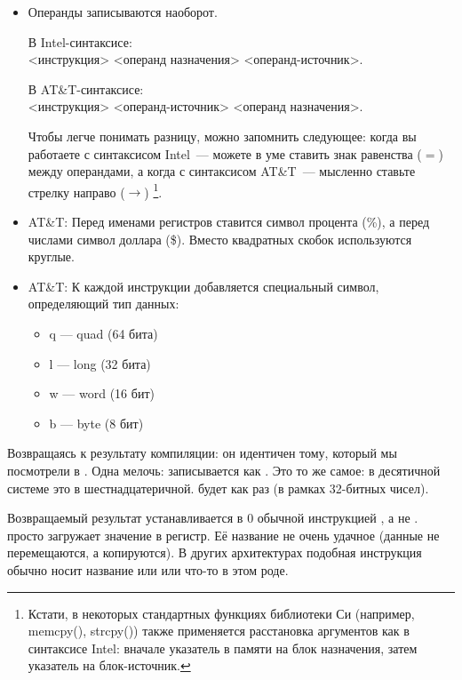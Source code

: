 \begin{itemize}

\item
Операнды записываются наоборот.

В Intel-синтаксисе: \\
<инструкция> <операнд назначения> <операнд-источник>.

В AT\&T-синтаксисе: \\
<инструкция> <операнд-источник> <операнд назначения>.

Чтобы легче понимать разницу, можно запомнить следующее:
когда вы работаете с синтаксисом Intel~--- можете в уме ставить знак равенства ($=$) между операндами,
а когда с синтаксисом AT\&T~--- мысленно ставьте стрелку направо ($\rightarrow$)
\footnote{Кстати, в некоторых стандартных функциях библиотеки Си (например, memcpy(), strcpy()) также применяется 
расстановка аргументов как в синтаксисе Intel: вначале указатель в памяти на блок назначения, 
затем указатель на блок-источник.}.

\item
AT\&T: Перед именами регистров ставится символ процента (\%), а перед числами символ доллара (\$).
Вместо квадратных скобок используются круглые.

\item
AT\&T: К каждой инструкции добавляется специальный символ, определяющий тип данных:

\begin{itemize}
\item q --- quad (64 бита)
\item l --- long (32 бита)
\item w --- word (16 бит)
\item b --- byte (8 бит)
\end{itemize}


\end{itemize}

Возвращаясь к результату компиляции: он идентичен тому, который мы посмотрели в \IDA.
Одна мелочь:  записывается как .
Это то же самое:  в десятичной системе это  в шестнадцатеричной.
 будет как раз  (в рамках 32-битных чисел).

Возвращаемый результат устанавливается в 0 обычной инструкцией \MOV, а не \XOR.
\MOV просто загружает значение в регистр.
Её название не очень удачное (данные не перемещаются, а копируются). В других архитектурах подобная инструкция обычно носит название  или  или что-то в этом роде.

